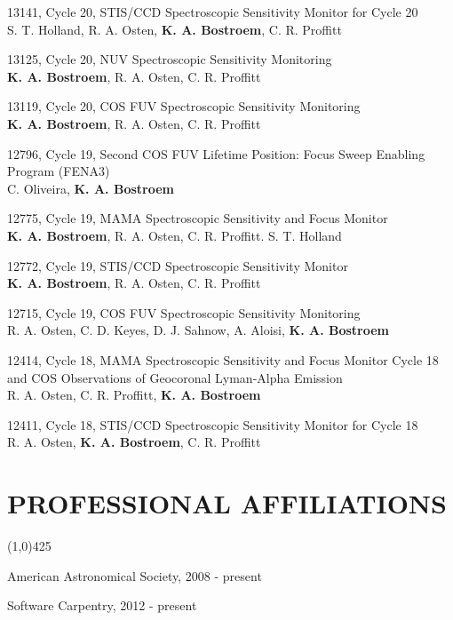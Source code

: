 \documentclass{res}
\begin{document}
\begin{resume}
13141, Cycle 20, STIS/CCD Spectroscopic Sensitivity Monitor for Cycle 20 \\
S. T. Holland, R. A. Osten, {\bf K. A. Bostroem}, C. R. Proffitt

13125, Cycle 20, NUV Spectroscopic Sensitivity Monitoring \\
{\bf K. A. Bostroem}, R. A. Osten, C. R. Proffitt

13119, Cycle 20, COS FUV Spectroscopic Sensitivity Monitoring \\
{\bf K. A. Bostroem}, R. A. Osten, C. R. Proffitt

12796, Cycle 19, Second COS FUV Lifetime Position: Focus Sweep Enabling Program (FENA3) \\
C. Oliveira, {\bf K. A. Bostroem}

12775, Cycle 19, MAMA Spectroscopic Sensitivity and Focus Monitor \\
{\bf K. A. Bostroem}, R. A. Osten, C. R. Proffitt. S. T. Holland

12772, Cycle 19, STIS/CCD Spectroscopic Sensitivity Monitor \\
{\bf K. A. Bostroem}, R. A. Osten, C. R. Proffitt

12715, Cycle 19, COS FUV Spectroscopic Sensitivity Monitoring \\
R. A. Osten, C. D. Keyes, D. J. Sahnow, A. Aloisi, {\bf K. A. Bostroem}

12414, Cycle 18, MAMA Spectroscopic Sensitivity and Focus Monitor Cycle 18 and COS Observations of Geocoronal Lyman-Alpha Emission \\
R. A. Osten, C. R. Proffitt, {\bf K. A. Bostroem}

12411, Cycle 18, STIS/CCD Spectroscopic Sensitivity Monitor for Cycle 18 \\
R. A. Osten, {\bf K. A. Bostroem}, C. R. Proffitt



\section{PROFESSIONAL AFFILIATIONS}
\vspace{-.2in} 
\begin{center}
\line(1,0){425}
\end{center}
\vspace{-.3in}  
\vspace{0.1in} 
    American Astronomical Society, 2008 - present

    Software Carpentry, 2012 - present
    

\end{resume}
\end{document}
